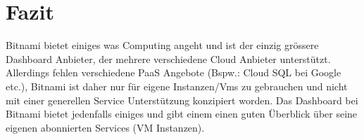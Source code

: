 \section{Fazit}
Bitnami bietet einiges was Computing angeht und ist der einzig grössere 
Dashboard Anbieter, der mehrere verschiedene Cloud Anbieter unterstützt.
Allerdings fehlen verschiedene PaaS Angebote (Bspw.: Cloud SQL bei Google etc.), 
Bitnami ist daher nur für eigene Instanzen/Vms zu gebrauchen und nicht mit einer 
generellen Service Unterstützung konzipiert worden.
Das Dashboard bei Bitnami bietet jedenfalls einiges und gibt einem einen guten 
Überblick über seine eigenen abonnierten Services (VM Instanzen).
